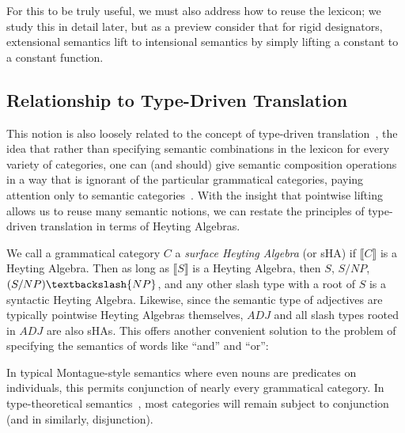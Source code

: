 \documentclass[11pt,a4paper,acceptedWithA]{article}
\begin{document}
For this to be truly useful, we must also address how to reuse the lexicon; we study this in detail later, but as a preview consider that for rigid designators, extensional semantics lift to intensional semantics by simply lifting a constant to a constant function.

\subsection{Relationship to Type-Driven Translation}


This notion is also loosely related to the concept of type-driven translation~\cite{klein1985type}, the idea that rather than specifying semantic combinations in the lexicon for every variety of categories, one can (and should) give semantic composition operations in a way that is ignorant of the particular grammatical categories, paying attention only to semantic categories~. With the insight that pointwise lifting allows us to reuse many semantic notions, we can restate the principles of type-driven translation in terms of Heyting Algebras.

We call a grammatical category $C$ a \emph{surface Heyting Algebra} (or \textsf{sHA}) if $\llbracket C\rrbracket$ is a Heyting Algebra.  Then as long as $\llbracket S\rrbracket$ is a Heyting Algebra, then $S$, $S/NP$, $(S/NP)\textbackslash{NP}$, and any other slash type with a root of $S$ is a syntactic Heyting Algebra. Likewise, since the semantic type of adjectives are typically pointwise Heyting Algebras themselves, $ADJ$ and all slash types rooted in $ADJ$ are also \textsf{sHA}s. This offers another convenient solution to the problem of specifying the semantics of words like ``and'' and ``or'':
\begin{mathpar}
\end{mathpar}
In typical Montague-style semantics where even nouns are predicates on individuals, this permits conjunction of nearly every grammatical category. In type-theoretical semantics~, most categories will remain subject to conjunction (and in similarly, disjunction).
\end{document}
